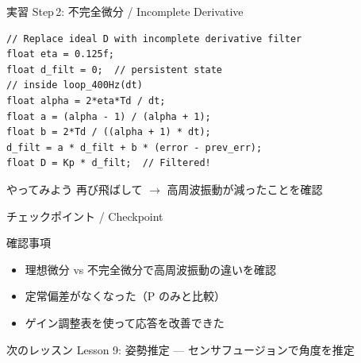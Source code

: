\begin{frame}[fragile]{実習 Step\,2: 不完全微分 / Incomplete Derivative}
  \begin{lstlisting}[style=sfcpp, title={user\_code.cpp (D term replacement)}]
// Replace ideal D with incomplete derivative filter
float eta = 0.125f;
float d_filt = 0;  // persistent state
// inside loop_400Hz(dt)
float alpha = 2*eta*Td / dt;
float a = (alpha - 1) / (alpha + 1);
float b = 2*Td / ((alpha + 1) * dt);
d_filt = a * d_filt + b * (error - prev_err);
float D = Kp * d_filt;  // Filtered!
  \end{lstlisting}

  \begin{exampleblock}{やってみよう}
    再び飛ばして $\to$ 高周波振動が減ったことを確認
  \end{exampleblock}
\end{frame}

\begin{frame}{チェックポイント / Checkpoint}
  \begin{alertblock}{確認事項}
    \begin{itemize}
      \item[$\square$] 理想微分 vs 不完全微分で高周波振動の違いを確認
      \item[$\square$] 定常偏差がなくなった（P のみと比較）
      \item[$\square$] ゲイン調整表を使って応答を改善できた
    \end{itemize}
  \end{alertblock}

  \vspace{1em}

  \begin{block}{次のレッスン}
    Lesson 9: 姿勢推定 --- センサフュージョンで角度を推定
  \end{block}
\end{frame}
